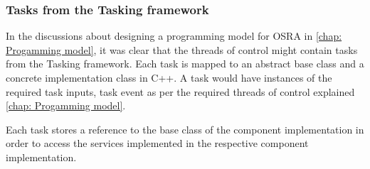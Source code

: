 \subsubsection{\textbf{Tasks from the Tasking framework}}
In the discussions about designing a programming model for OSRA in \cref{chap: Progamming model}, it was clear that the threads of control might contain tasks from the Tasking framework. Each task is mapped to an abstract base class and a concrete implementation class in C++. A task would have instances of the required task inputs, task event as per the required threads of control explained \cref{chap: Progamming model}.

Each task stores a reference to the base class of the component implementation in order to access the services implemented in the respective component implementation.  

